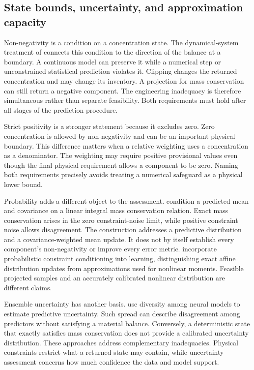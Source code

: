 \subsection{State bounds, uncertainty, and approximation capacity}

Non-negativity is a condition on a concentration state. The dynamical-system treatment of \citet{Haddad2010} connects this condition to the direction of the balance at a boundary. A continuous model can preserve it while a numerical step or unconstrained statistical prediction violates it. Clipping changes the returned concentration and may change its inventory. A projection for mass conservation can still return a negative component. The engineering inadequacy is therefore simultaneous rather than separate feasibility. Both requirements must hold after all stages of the prediction procedure.

Strict positivity is a stronger statement because it excludes zero. Zero concentration is allowed by non-negativity and can be an important physical boundary. This difference matters when a relative weighting uses a concentration as a denominator. The weighting may require positive provisional values even though the final physical requirement allows a component to be zero. Naming both requirements precisely avoids treating a numerical safeguard as a physical lower bound.

Probability adds a different object to the assessment. \citet{Hansen2024} condition a predicted mean and covariance on a linear integral mass conservation relation. Exact mass conservation arises in the zero constraint-noise limit, while positive constraint noise allows disagreement. The construction addresses a predictive distribution and a covariance-weighted mean update. It does not by itself establish every component's non-negativity or improve every error metric. \citet{Utkarsh2025} incorporate probabilistic constraint conditioning into learning, distinguishing exact affine distribution updates from approximations used for nonlinear moments. Feasible projected samples and an accurately calibrated nonlinear distribution are different claims.

Ensemble uncertainty has another basis. \citet{Lakshminarayanan2017} use diversity among neural models to estimate predictive uncertainty. Such spread can describe disagreement among predictors without satisfying a material balance. Conversely, a deterministic state that exactly satisfies mass conservation does not provide a calibrated uncertainty distribution. These approaches address complementary inadequacies. Physical constraints restrict what a returned state may contain, while uncertainty assessment concerns how much confidence the data and model support.

